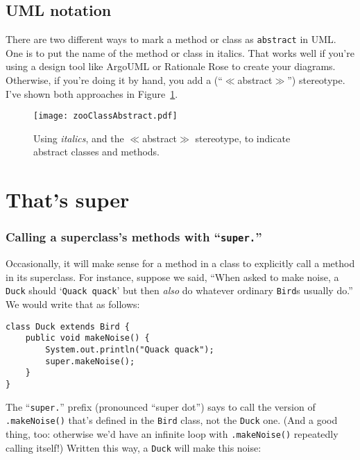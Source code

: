 \subsection{UML notation}

There are two different ways to mark a method or class as \texttt{abstract} in
UML. One is to put the name of the method or class in italics. That works well
if you're using a design tool like ArgoUML or Rationale Rose to create your
diagrams. Otherwise, if you're doing it by hand, you add a
(``$\ll$abstract$\gg$'') stereotype. I've shown both approaches in
Figure~\ref{fig:zooClassAbstract}.

\begin{figure}
\centering
\texttt{[image: zooClassAbstract.pdf]}
\caption{Using \textit{italics}, and the $\ll$abstract$\gg$ stereotype, to
indicate abstract classes and methods.}
\label{fig:zooClassAbstract}
\end{figure}

\section{That's super}

\subsubsection{Calling a superclass's methods with ``\texttt{super.}''}

Occasionally, it will make sense for a method in a class to explicitly call a
method in its superclass. For instance, suppose we said, ``When asked to make
noise, a \texttt{Duck} should `\texttt{Quack quack}' but then \textit{also} do
whatever ordinary \texttt{Bird}s usually do.'' We would write that as follows:

\begin{Verbatim}[fontsize=\footnotesize,samepage=true,frame=single]
class Duck extends Bird {
    public void makeNoise() {
        System.out.println("Quack quack");
        super.makeNoise();
    }
}
\end{Verbatim}

The ``\texttt{super.}'' prefix (pronounced ``super dot'') says to call the
version of \texttt{.makeNoise()} that's defined in the \texttt{Bird}
class, not the \texttt{Duck} one. (And a good thing, too: otherwise we'd have
an infinite loop with \texttt{.makeNoise()} repeatedly calling itself!)
Written this way, a \texttt{Duck} will make this noise:

